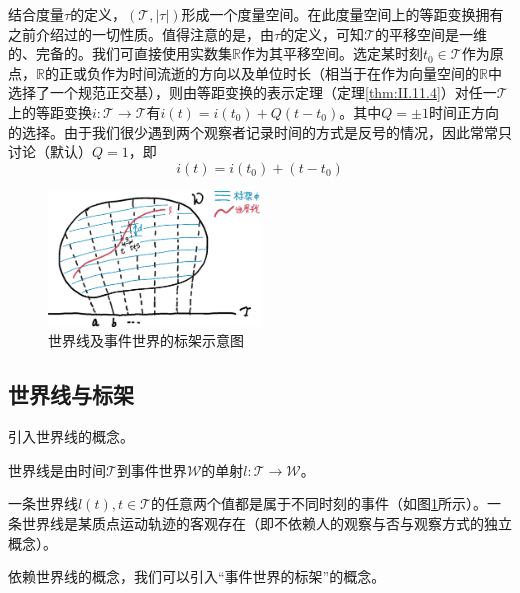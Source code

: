 \documentclass[main.tex]{subfiles}
\begin{document}
结合度量$\tau$的定义，$\left(\mathcal{T},\left|\tau\right|\right)$形成一个度量空间。在此度量空间上的等距变换拥有之前介绍过的一切性质。值得注意的是，由$\tau$的定义，可知$\mathcal{T}$的平移空间是一维的、完备的。我们可直接使用实数集$\mathbb{R}$作为其平移空间。选定某时刻$t_0\in\mathcal{T}$作为原点，$\mathbb{R}$的正或负作为时间流逝的方向以及单位时长（相当于在作为向量空间的$\mathbb{R}$中选择了一个规范正交基），则由等距变换的表示定理（定理\ref{thm:II.11.4}）对任一$\mathcal{T}$上的等距变换$i:\mathcal{T}\rightarrow\mathcal{T}$有$i\left(t\right)=i\left(t_0\right)+ Q\left(t-t_0\right)$。其中$Q=\pm 1$时间正方向的选择。由于我们很少遇到两个观察者记录时间的方式是反号的情况，因此常常只讨论（默认）$Q=1$，即
\[
i\left(t\right)=i\left(t_0\right)+\left(t-t_0\right)
\]

\begin{figure}[h]
    \centering
    \includegraphics[width=0.5\textwidth]{images/III.1.3.eps}
    \caption{世界线及事件世界的标架示意图}
    \label{fig:III.1.3}
\end{figure}

\subsection{世界线与标架}
引入世界线的概念。

\begin{definition}[世界线]
世界线是由时间$\mathcal{T}$到事件世界$\mathcal{W}$的单射$l:\mathcal{T}\rightarrow\mathcal{W}$。
\end{definition}

一条世界线$l\left(t\right),t\in\mathcal{T}$的任意两个值都是属于不同时刻的事件（如图\ref{fig:III.1.3}所示）。一条世界线是某质点运动轨迹的客观存在（即不依赖人的观察与否与观察方式的独立概念）。

依赖世界线的概念，我们可以引入“事件世界的标架”的概念。
\end{document}

